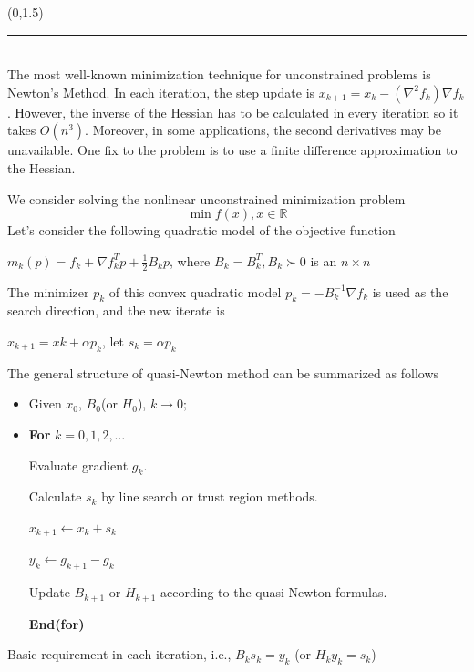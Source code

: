 \documentclass[a0]{a0poster}
\newcommand{\lt}{\left}
\newcommand{\rt}{\right}
\newcommand{\al}{\alpha}
\newcommand{\fr}{\frac}
\newcommand{\bb}{\mathbb}
\def\Head#1{\noindent{\LARGE\color{bluegray} #1}\bigskip}
\begin{document}
\begin{textblock}{7.1}(0,1.5)
	
\hrule\medskip
\Head{Introduction}\\
The most well-known minimization technique for unconstrained problems is Newton’s Method.
In each iteration, the step update is $x_{k+1} = x_k - \lt(\nabla^2f_k\rt)\nabla f_k$.
Ноwever, the inverse of the Hessian has to be calculated in every
iteration so it takes $O\lt(n^3\rt)$. Moreover, in some applications, the second derivatives
may be unavailable. One fix to the problem is to use a finite difference approximation to
the Hessian.

We consider solving the nonlinear unconstrained minimization problem
$$\min f(x), x \in \bb{R}$$
Let's consider the following quadratic model of the objective function

$m_k(p) = f_k + \nabla f_k^Tp + \fr{1}{2}B_kp$, 
where $B_k = B_k^T, B_k \succ 0$ is an $n \times n$

The minimizer $p_k$ of this convex quadratic model
$p_k =  - B_k^{-1}\nabla f_k$
is used as the search direction, and the new iterate is 

$x_{k+1} = xk + \al p_k$, let $s_k = \al p_k$


The general structure of quasi-Newton method can be summarized as follows

\begin{itemize}
\item Given $x_0$, $B_0$(or $H_0$), $k \rightarrow 0;$

\item \textbf{For} $k = 0, 1, 2, \dots$

\quad Evaluate gradient $g_k$.

\quad Calculate $s_k$ by line search or trust region methods.

\quad $x_{k+1} \leftarrow x_k + s_k$

\quad $y_k \leftarrow  g_{k+1} - g_k$

\quad Update $B_{k+1}$ or $H_{k+1}$ according to the quasi-Newton formulas.

\textbf{End(for)}

\end{itemize}
Basic requirement in each iteration, i.e.,
$B_k s_k = y_k$ (or $H_k y_k = s_k$)


\end{textblock}
\end{document}
